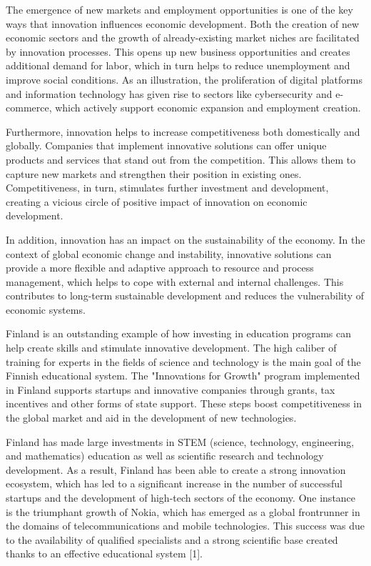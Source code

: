 \begin{multicols}{2}
The emergence of new markets and employment opportunities is one of the
key ways that innovation influences economic development. Both the
creation of new economic sectors and the growth of already-existing
market niches are facilitated by innovation processes. This opens up new
business opportunities and creates additional demand for labor, which in
turn helps to reduce unemployment and improve social conditions. As an
illustration, the proliferation of digital platforms and information
technology has given rise to sectors like cybersecurity and e-commerce,
which actively support economic expansion and employment creation.

Furthermore, innovation helps to increase competitiveness both
domestically and globally. Companies that implement innovative solutions
can offer unique products and services that stand out from the
competition. This allows them to capture new markets and strengthen
their position in existing ones. Competitiveness, in turn, stimulates
further investment and development, creating a vicious circle of
positive impact of innovation on economic development.

In addition, innovation has an impact on the sustainability of the
economy. In the context of global economic change and instability,
innovative solutions can provide a more flexible and adaptive approach
to resource and process management, which helps to cope with external
and internal challenges. This contributes to long-term sustainable
development and reduces the vulnerability of economic systems.

Finland is an outstanding example of how investing in education programs
can help create skills and stimulate innovative development. The high
caliber of training for experts in the fields of science and technology
is the main goal of the Finnish educational system. The "Innovations for
Growth" program implemented in Finland supports startups and innovative
companies through grants, tax incentives and other forms of state
support. These steps boost competitiveness in the global market and aid
in the development of new technologies.

Finland has made large investments in STEM (science, technology,
engineering, and mathematics) education as well as scientific research
and technology development. As a result, Finland has been able to create
a strong innovation ecosystem, which has led to a significant increase
in the number of successful startups and the development of high-tech
sectors of the economy. One instance is the triumphant growth of Nokia,
which has emerged as a global frontrunner in the domains of
telecommunications and mobile technologies. This success was due to the
availability of qualified specialists and a strong scientific base
created thanks to an effective educational system {[}1{]}.


\end{multicols}
